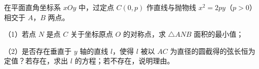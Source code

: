 \begin{question}
在平面直角坐标系 $xOy$ 中，过定点 $C(0,p)$ 作直线与抛物线 $x^2=2py$（$p>0$）相交于 $A$，$B$ 两点。

（1）若点 $N$ 是点 $C$ 关于坐标原点 $O$ 的对称点，求 $\triangle ANB$ 面积的最小值；

（2）是否存在垂直于 $y$ 轴的直线 $l$，使得 $l$ 被以 $AC$ 为直径的圆截得的弦长恒为定值？若存在，求出 $l$ 的方程；若不存在，说明理由。
\nopagebreak[4]
\begin{center}\end{center}
\nopagebreak[4]

\end{question}